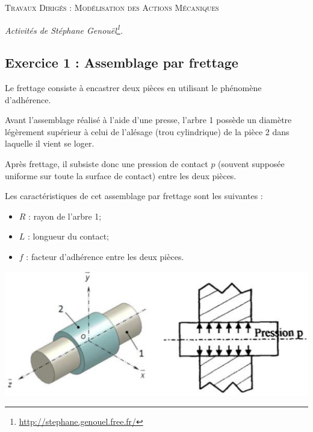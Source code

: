 \documentclass[10pt]{article}
\begin{document}

\begin{center}
\Large{\textsc{Travaux Dirigés : Modélisation des Actions Mécaniques}}
\end{center}
\begin{flushright}
\textit{Activités de Stéphane Genouël\footnote{\url{http://stephane.genouel.free.fr/}}.}
\end{flushright}
\vspace{.5cm}



\subsection*{Exercice 1 : Assemblage par frettage}
\begin{minipage}[c]{.5\linewidth}
Le frettage consiste à encastrer deux pièces en utilisant le phénomène d’adhérence. 
 
Avant l’assemblage réalisé à l’aide d’une presse, l’arbre 1 
possède un diamètre légèrement supérieur à celui de l’alésage 
(trou cylindrique) de la pièce 2 dans laquelle il vient se loger. 
 
Après frettage, il subsiste donc une pression de contact $p$ 
(souvent supposée uniforme sur toute la surface de contact) 
entre les deux pièces. 

 
Les caractéristiques de cet assemblage par frettage sont les suivantes : 
\begin{itemize}
\item $R$ : rayon de l’arbre 1;
\item $L$ : longueur du contact; 
\item $f$ : facteur d’adhérence entre les deux pièces.
\end{itemize}


\end{minipage}\hfill
\begin{minipage}[c]{.48\linewidth}
\begin{center}
\includegraphics[width=\textwidth]{images/fig_01}
\end{center}
\end{minipage}
\end{document}
